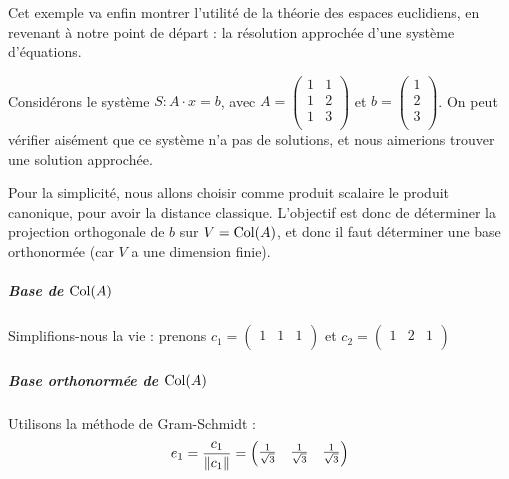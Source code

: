 \begin{exemple}
Cet exemple va enfin montrer l'utilité de la théorie des espaces euclidiens, en revenant à notre point de départ : la résolution approchée d'une système d'équations.

Considérons le système $S \colon A\cdot x = b$, avec $A = \begin{pmatrix} 1 & 1 \\ 1 & 2 \\ 1 & 3 \\ \end{pmatrix}$ et $b=\begin{pmatrix} 1 \\ 2 \\ 3 \\ \end{pmatrix}$. On peut vérifier aisément que ce système n'a pas de solutions, et nous aimerions trouver une solution approchée.

Pour la simplicité, nous allons choisir comme produit scalaire le produit canonique, pour avoir la distance classique. L'objectif est donc de déterminer la projection orthogonale de $b$ sur $V=\mathrm{Col}(A)$, et donc il faut déterminer une base orthonormée (car $V$ a une dimension finie).

\subparagraph{Base de $\mathrm{Col}(A)$}
Simplifions-nous la vie : prenons $c_1 = \begin{pmatrix} 1 & 1 & 1 \\ \end{pmatrix}$ et $c_2 = \begin{pmatrix} 1 & 2 & 1 \\ \end{pmatrix}$

\subparagraph{Base orthonormée de $\mathrm{Col}(A)$}
Utilisons la méthode de Gram-Schmidt :
\[ e_1 = \frac{c_1}{\| c_1 \|} = \begin{pmatrix}
\frac{1}{\sqrt{3}} & \frac{1}{\sqrt{3}} & \frac{1}{\sqrt{3}}
\end{pmatrix} \]


\end{exemple}
